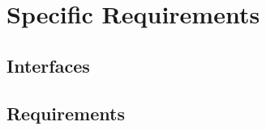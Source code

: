 \documentclass{article}
\begin{document}
\newpage
\section{Specific Requirements}

\subsection{Interfaces}

\subsection{Requirements}

\end{document}
